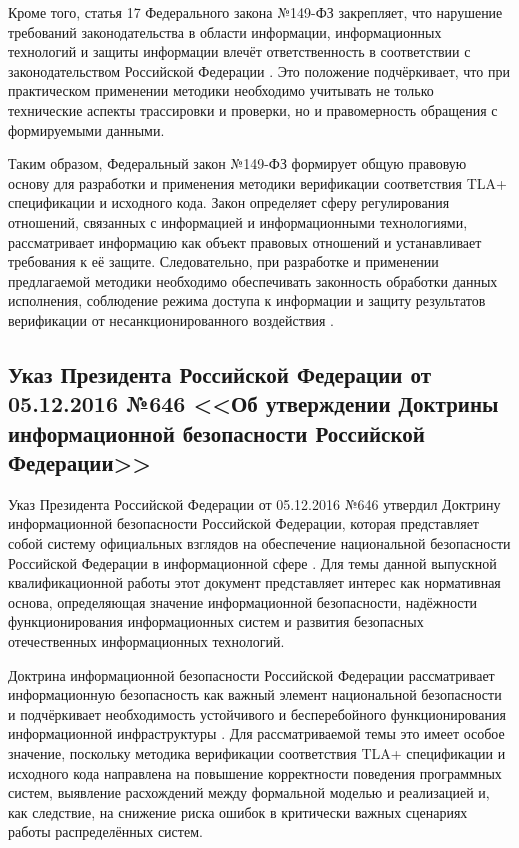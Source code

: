 Кроме того, статья 17 Федерального закона №149-ФЗ закрепляет, что
нарушение требований законодательства в области информации,
информационных технологий и защиты информации влечёт ответственность в
соответствии с законодательством Российской Федерации \cite{fz149_info}.
Это положение подчёркивает, что при практическом применении методики
необходимо учитывать не только технические аспекты трассировки и проверки,
но и правомерность обращения с формируемыми данными.

Таким образом, Федеральный закон №149-ФЗ формирует общую правовую основу
для разработки и применения методики верификации соответствия TLA+
спецификации и исходного кода. Закон определяет сферу регулирования
отношений, связанных с информацией и информационными технологиями,
рассматривает информацию как объект правовых отношений и устанавливает
требования к её защите. Следовательно, при разработке и применении
предлагаемой методики необходимо обеспечивать законность обработки данных
исполнения, соблюдение режима доступа к информации и защиту результатов
верификации от несанкционированного воздействия \cite{fz149_info}.

\subsection{Указ Президента Российской Федерации от 05.12.2016 №646 <<Об утверждении Доктрины информационной безопасности Российской Федерации>>}

Указ Президента Российской Федерации от 05.12.2016 №646 утвердил
Доктрину информационной безопасности Российской Федерации, которая
представляет собой систему официальных взглядов на обеспечение
национальной безопасности Российской Федерации в информационной сфере
\cite{doctrine_ib_rf}. Для темы данной выпускной квалификационной работы
этот документ представляет интерес как нормативная основа, определяющая
значение информационной безопасности, надёжности функционирования
информационных систем и развития безопасных отечественных информационных
технологий.

Доктрина информационной безопасности Российской Федерации рассматривает
информационную безопасность как важный элемент национальной безопасности и
подчёркивает необходимость устойчивого и бесперебойного функционирования
информационной инфраструктуры \cite{doctrine_ib_rf}. Для рассматриваемой
темы это имеет особое значение, поскольку методика верификации
соответствия TLA+ спецификации и исходного кода направлена на повышение
корректности поведения программных систем, выявление расхождений между
формальной моделью и реализацией и, как следствие, на снижение риска
ошибок в критически важных сценариях работы распределённых систем.

